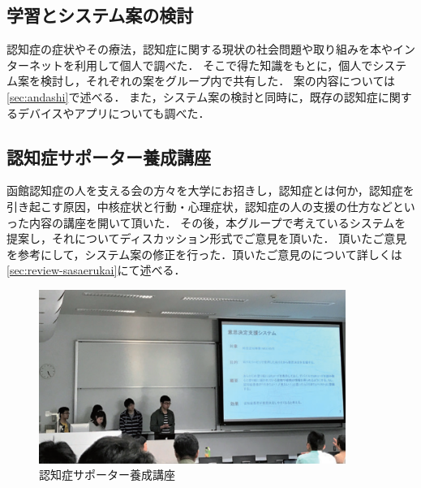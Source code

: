 \documentclass[../report]{subfiles}
\begin{document}
\subsection{学習とシステム案の検討}\label{sec:kentou}
認知症の症状やその療法，認知症に関する現状の社会問題や取り組みを本やインターネットを利用して個人で調べた．
そこで得た知識をもとに，個人でシステム案を検討し，それぞれの案をグループ内で共有した．
案の内容については\ref{sec:andashi}で述べる．
また，システム案の検討と同時に，既存の認知症に関するデバイスやアプリについても調べた．

\subsection{認知症サポーター養成講座}
函館認知症の人を支える会の方々を大学にお招きし，認知症とは何か，認知症を引き起こす原因，中核症状と行動・心理症状，認知症の人の支援の仕方などといった内容の講座を開いて頂いた．
その後，本グループで考えているシステムを提案し，それについてディスカッション形式でご意見を頂いた．
頂いたご意見を参考にして，システム案の修正を行った．頂いたご意見のについて詳しくは\ref{sec:review-sasaerukai}にて述べる．
\begin{figure}[htbp]
    \begin{center}
        \includegraphics[width=10cm]{imgs/ninchisyo-kouza.png}
        \caption{認知症サポーター養成講座}
        \label{fig:ninchisyo-kouza}
    \end{center}
\end{figure}
\end{document}
